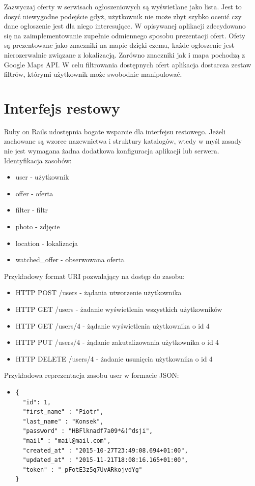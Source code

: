 Zazwyczaj oferty w serwisach ogłoszeniowych są wyświetlane jako lista. Jest to dosyć niewygodne podejście gdyż, użytkownik nie może zbyt szybko ocenić czy dane ogłoszenie jest dla niego interesujące. W opisywanej aplikacji zdecydowano się na zaimplementowanie zupełnie odmiennego sposobu prezentacji ofert. Ofety są prezentowane jako znaczniki na mapie dzięki czemu, każde ogłoszenie jest nierozerwalnie związane z lokalizacją. Zarówno znaczniki jak i mapa pochodzą z Google Maps API. W celu filtrowania dostępnych ofert aplikacja dostarcza zestaw filtrów, którymi użytkownik może swobodnie manipulować. 

\section{Interfejs restowy}
\label{sec:interfejsRestowy}
Ruby on Rails udostępnia bogate wsparcie dla interfejsu restowego. Jeżeli zachowane są wzorce nazewnictwa i struktury katalogów, wtedy w myśl zasady  nie jest wymagana żadna dodatkowa konfiguracja aplikacji lub serwera.\cite{rails}\\
Identyfikacja zasobów:
\begin{itemize}
\item user - użytkownik
\item offer - oferta
\item filter - filtr
\item photo - zdjęcie
\item location - lokalizacja
\item watched\_offer - obserwowana oferta
\end{itemize}
Przykładowy format URI pozwalający na dostęp do zasobu:
\begin{itemize}
\item HTTP POST /users - żądania utworzenie użytkownika
\item HTTP GET /users - żadanie wyświetlenia wszystkich użytkowników
\item HTTP GET /users/4 - żądanie wyświetlenia użytkownika o id 4
\item HTTP PUT /users/4 - żądanie zakutalizowania użytkownika o id 4
\item HTTP DELETE /users/4 - żadanie usunięcia użytkownika o id 4
\end{itemize}
Przykładowa reprezentacja zasobu user w formacie JSON:
\begin{itemize}
\item \begin{lstlisting}
{
  "id": 1,
  "first_name" : "Piotr",
  "last_name" : "Konsek",
  "password" : "HBFlknadf7a09*&(^dsji",
  "mail" : "mail@mail.com",
  "created_at" : "2015-10-27T23:49:08.694+01:00",
  "updated_at" : "2015-11-21T18:08:16.165+01:00",
  "token" : "_pFotE3z5q7UvARkojvdYg"
}
\end{lstlisting}
\end{itemize}

